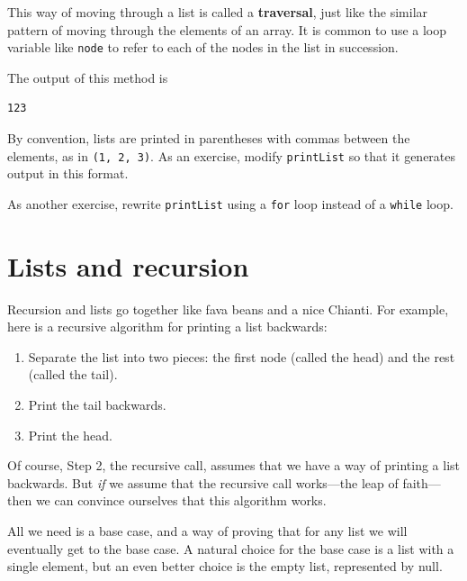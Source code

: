 \documentclass[12pt]{book}
\theoremstyle{exercise}
\begin{document}
This way of moving through a list is called a {\bf traversal},
just like the similar pattern of moving through the elements of
an array.  It is common to use a loop variable like {\tt node}
to refer to each of the nodes in the list in succession.


The output of this method is

\begin{verbatim}
123
\end{verbatim}
%
By convention, lists are printed in parentheses with commas
between the elements, as in {\tt (1, 2, 3)}.  As an exercise, modify
{\tt printList} so that it generates output in this format.

As another exercise, rewrite {\tt printList} using a {\tt for} loop
instead of a {\tt while} loop.

\section{Lists and recursion}

Recursion and lists go together like fava beans and a nice
Chianti.  For example, here is a recursive algorithm for printing
a list backwards:


\begin{enumerate}

\item Separate the list into two pieces: the first node (called
the head) and the rest (called the tail).

\item Print the tail backwards.

\item Print the head.

\end{enumerate}

Of course, Step 2, the recursive call, assumes that we have a way of
printing a list backwards.  But {\em if} we assume that the recursive
call works---the leap of faith---then we can convince ourselves that
this algorithm works.


All we need is a base case, and a way of proving that for
any list we will eventually get to the base case.  A natural
choice for the base case is a list with a single element, but
an even better choice is the empty list, represented by null.
\end{document}

